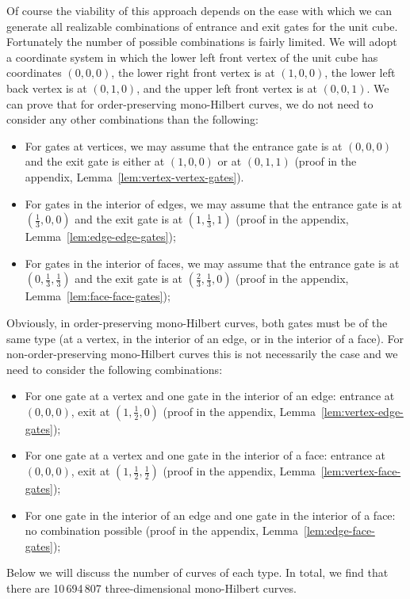 \documentclass[11pt,a4paper]{article}
\begin{document}
Of course the viability of this approach depends on the ease with which we can generate all realizable combinations of entrance and exit gates for the unit cube. Fortunately the number of possible combinations is fairly limited. We will adopt a coordinate system in which the lower left front vertex of the unit cube has coordinates $(0,0,0)$, the lower right front vertex is at $(1,0,0)$, the lower left back vertex is at $(0,1,0)$, and the upper left front vertex is at $(0,0,1)$. We can prove that for order-preserving mono-Hilbert curves, we do not need to consider any other combinations than the following:\begin{itemize}
\item For gates at vertices, we may assume that the entrance gate is at $(0,0,0)$ and the exit gate is either at $(1,0,0)$ or at $(0,1,1)$ (proof in the appendix, Lemma~\ref{lem:vertex-vertex-gates}).
\item For gates in the interior of edges, we may assume that the entrance gate is at $(\frac13,0,0)$ and the exit gate is at $(1,\frac13,1)$ (proof in the appendix, Lemma~\ref{lem:edge-edge-gates});
\item For gates in the interior of faces, we may assume that the entrance gate is at $(0,\frac13,\frac13)$ and the exit gate is at $(\frac23,\frac13,0)$  (proof in the appendix, Lemma~\ref{lem:face-face-gates});
\end{itemize}
Obviously, in order-preserving mono-Hilbert curves, both gates must be of the same type (at a vertex, in the interior of an edge, or in the interior of a face). For non-order-preserving mono-Hilbert curves this is not necessarily the case and we need to consider the following combinations:\begin{itemize}
\item For one gate at a vertex and one gate in the interior of an edge: entrance at $(0,0,0)$, exit at $(1,\frac12,0)$ (proof in the appendix, Lemma~\ref{lem:vertex-edge-gates});
\item For one gate at a vertex and one gate in the interior of a face: entrance at $(0,0,0)$, exit at $(1,\frac12,\frac12)$ (proof in the appendix, Lemma~\ref{lem:vertex-face-gates});
\item For one gate in the interior of an edge and one gate in the interior of a face: no combination possible (proof in the appendix, Lemma~\ref{lem:edge-face-gates});
\end{itemize}

Below we will discuss the number of curves of each type. In total, we find that there are 10\,694\,807 three-dimensional mono-Hilbert curves.
\end{document}

